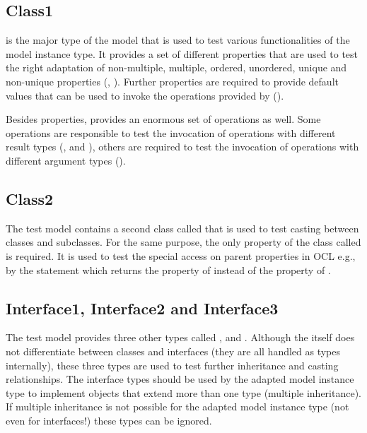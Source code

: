 \subsection{Class1}

 is the major type of the model that is used to test various 
functionalities of the model instance type. It provides a set of different
properties that are used to test the right adaptation of non-multiple, 
multiple, ordered, unordered, unique and non-unique properties 
(, ). Further 
properties are required to provide default values that can be used to invoke 
the operations provided by  ().

Besides properties,  provides an enormous set of operations as 
well. Some operations are responsible to test the invocation of operations  with
different result types (,  
and ), others are required to test the invocation 
of operations with different argument types 
().


\subsection{Class2}

The test model contains a second class called  that is used to
test casting between classes and subclasses. For the same purpose, the only 
property of the class called  is required. 
It is used to test the special access on parent properties in \acs{OCL} e.g., 
by the statement  which 
returns the property of  instead of the property of .


\subsection{Interface1, Interface2 and Interface3}

The test model provides three other types called , 
 and . Although the 
itself does not differentiate between classes and interfaces (they are all 
handled as types internally), these three types are used to test further 
inheritance and casting relationships. The interface types should be used by 
the adapted model instance type to implement objects that extend more than one
type (multiple inheritance). If multiple inheritance is not possible for the 
adapted model instance type (not even for interfaces!) these types can be
ignored.


